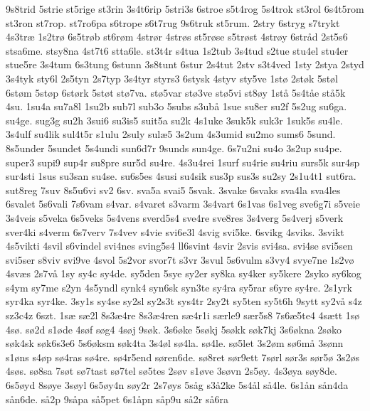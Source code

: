 9s8trid
5strie
st5rige
st3rin
3s4t6rip
5stri3s
6stroe
s5t4rog
5s4trok
st3rol
6s4t5rom
st3ron
st7rop.
st7ro6pa
s6trope
s6t7rug
9s6truk
st5rum.
2stry
6stryg
s7trykt
4s3tr^^e6
1s2tr^^f8
6s5tr^^f8b
st6r^^f8m
4str^^f8r
4str^^f8s
st5r^^f8se
s5tr^^f8st
4str^^f8y
6str^^e5d
2st5s6
stsa6me.
stsy8na
4st7t6
stta6le.
st3t4r
s4tua
1s2tub
3s4tud
s2tue
stu4el
stu4er
stue5re
3s4tum
6s3tung
6stunn
3s8tunt
6stur
2s4tut
2stv
s3t4ved
1sty
2stya
2styd
3s4tyk
sty6l
2s5tyn
2s7typ
3s4tyr
styrs3
6stysk
4styv
sty5ve
1st^^f8
2st^^f8k
5st^^f8l
6st^^f8m
5st^^f8p
6st^^f8rk
5st^^f8t
st^^f87va.
st^^f85var
st^^f83ve
st^^f85vi
st8^^f8y
1st^^e5
5s4t^^e5e
st^^e55k
4su.
1su4a
su7a8l
1su2b
sub7l
sub3o
5subs
s3ub^^e5
1sue
su8er
su2f
5s2ug
su6ga.
su4ge.
sug3g
su2h
3sui6
su3is5
suit5a
su2k
4s1uke
3suk5k
suk3r
1suk5s
su4le.
3s4ulf
su4lik
sul4t5r
s1ulu
2suly
sul^^e65
3s2um
4s3umid
su2mo
sums6
5sund.
8s5under
5sundet
5s4undi
sun6d7r
9sunds
sun4ge.
6s7u2ni
su4o
3s2up
su4pe.
super3
supi9
sup4r
su8pre
sur5d
su4re.
4s3u4rei
1surf
su4rie
su4riu
surs5k
sur4sp
sur4sti
1sus
su3san
su4se.
su6s5es
4susi
su4sik
sus3p
sus3s
su2sy
2s1u4t1
sut6ra.
sut8reg
7suv
8s5u6vi
sv2
6sv.
sva5a
svai5
5svak.
3svake
6svaks
sva4la
sva4les
6svalet
5s6vali
7s6vam
s4var.
s4varet
s3varm
3s4vart
6s1vas
6s1veg
sve6g7i
s5veie
3s4veis
s5veka
6s5veks
5s4vens
sverd5s4
sve4re
sve8res
3s4verg
5s4verj
s5verk
sver4ki
s4verm
6s7verv
7s4vev
s4vie
svi6e3l
4svig
svi5ke.
6svikg
4sviks.
3svikt
4s5vikti
4svil
s6vindel
svi4nes
sving5s4
ll6svint
4svir
2svis
svi4sa.
svi4se
svi5sen
svi5ser
s8viv
svi9ve
4svol
5s2vor
svor7t
s3vr
3svul
5s6vulm
s3vy4
svye7ne
1s2v^^f8
4sv^^e6s
2s7v^^e5
1sy
sy4c
sy4de.
sy5den
5sye
sy2er
sy8ka
sy4ker
sy5kere
2syko
sy6kog
s4ym
sy7me
s2yn
4s5yndl
synk4
syn6sk
syn3te
sy4ra
sy5rar
s6yre
sy4re.
2s1yrk
syr4ka
syr4ke.
3sy1s
sy4se
sy2sl
sy2s3t
sys4tr
2sy2t
sy5ten
sy5t6h
9sytt
sy2v^^e5
s4z
sz3c4z
6szt.
1s^^e6
s^^e62l
8s3^^e64re
8s3^^e64ren
s^^e64r1i
s^^e6rle9
s^^e6r5s8
7s6^^e65te4
4s^^e6tt
1s^^f8
4s^^f8.
s^^f82d
s1^^f8de
4s^^f8f
s^^f8g4
4s^^f8j
9s^^f8k.
3s6^^f8ke
5s^^f8kj
5s^^f8kk
s^^f8k7kj
3s6^^f8kna
2s^^f8ko
s^^f8k4sk
s^^f8k6s3e6
5s6^^f8ksm
s^^f8k4ta
3s4^^f8l
s^^f84la.
s^^f84le.
s^^f85let
3s2^^f8m
s^^f86m^^e5
3s^^f8nn
s1^^f8ns
s4^^f8p
s^^f84ras
s^^f84re.
s^^f84r5end
s^^f8ren6de.
s^^f88ret
s^^f8r9ett
7s^^f8rl
s^^f8r3s
s^^f8r5^^f8
3s2^^f8s
4s^^f8s.
s^^f88sa
7s^^f8t
s^^f87tast
s^^f87tel
s^^f85tes
2s^^f8v
s1^^f8ve
3s^^f8vn
2s5^^f8y.
4s3^^f8ya
s^^f8y8de.
6s5^^f8yd
8s^^f8ye
3s^^f8yl
6s5^^f8y4n
s^^f8y2r
2s7^^f8ys
5s^^e5g
s3^^e52ke
5s4^^e5l
s^^e54le.
6s1^^e5n
s^^e5n4da
s^^e5n6de.
s^^e52p
9s^^e5pa
s^^e55pet
6s1^^e5pn
s^^e5p9u
s^^e52r
s^^e56ra
